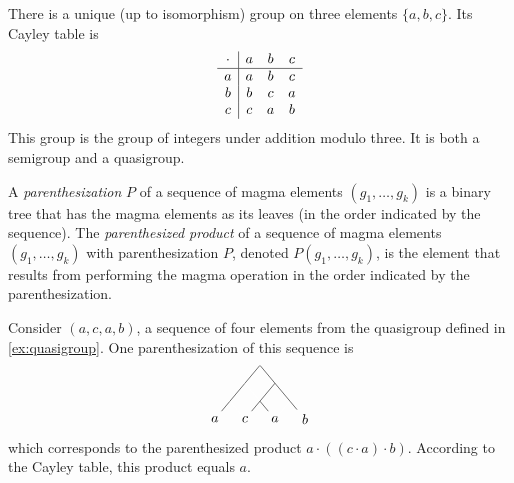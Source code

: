 \documentclass{article}
\begin{document}
\begin{example}
  There is a unique (up to isomorphism) group on three elements $\{a, b, c\}$.
  Its Cayley table is
  \begin{equation*}
    \begin{array}{c | c c c}
      \cdot & a & b & c \\
      \hline
      a & a & b & c \\
      b & b & c & a \\
      c & c & a & b \\
    \end{array}
  \end{equation*}
  This group is the group of integers under addition modulo three.
  It is both a semigroup and a quasigroup.
\end{example}

A \emph{parenthesization} $P$ of a sequence of magma elements $(g_1, \dotsc, g_k)$ is a binary tree that has the magma elements as its leaves (in the order indicated by the sequence).
The \emph{parenthesized product} of a sequence of magma elements $(g_1, \dotsc, g_k)$ with parenthesization $P$, denoted $P(g_1, \dotsc, g_k)$, is the element that results from performing the magma operation in the order indicated by the parenthesization.

\begin{example}
  Consider $(a, c, a, b)$, a sequence of four elements from the quasigroup defined in \autoref{ex:quasigroup}.
  One parenthesization of this sequence is
  \begin{equation*}
    \begin{tikzpicture}[xscale=0.5, yscale=0.3]
      \node[minimum size=0pt, inner sep=0pt] {}
      child {
        child {
          child {node {$a$}}
          child[color=white] {}
        }
        child[color=white] {}
      }
      child {
        child {
          child {node {$c$}}
          child {node {$a$}}
        }
        child {
          child[color=white] {}
          child {node {$b$}}
        }
      };
    \end{tikzpicture}
  \end{equation*}
  which corresponds to the parenthesized product $a \cdot ((c \cdot a) \cdot b)$.
  According to the Cayley table, this product equals $a$.
\end{example}
\end{document}
